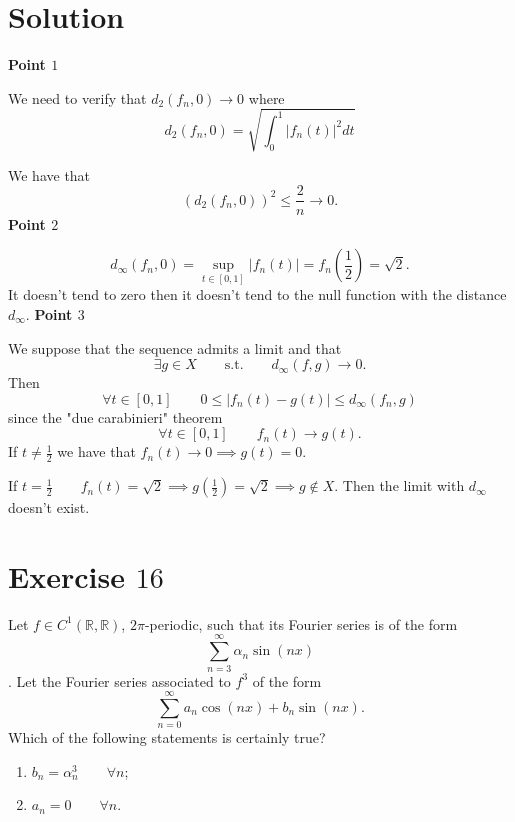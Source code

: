 \documentclass[a4paper, twoside, openany]{book}
\begin{document}
\section*{Solution}
\textbf{Point $1$} \par
We need to verify that $d_2(f_n, 0) \rightarrow 0$ where
$$d_2(f_n, 0) = \sqrt{\int_0^1 |f_n(t)|^2 dt}$$
\begin{figure}[!ht]
\begin{center}
\end{center}
\end{figure}
We have that
$$(d_2(f_n, 0))^2 \leq \frac{2}{n} \rightarrow 0.$$
\textbf{Point $2$} \par  
$$d_{\infty}(f_n, 0) = \sup_{t \in [0,1]} |f_n(t)| = f_n(\frac{1}{2}) = \sqrt{2}.$$
It doesn't tend to zero then it doesn't tend to the null function with the distance $d_{\infty}$.
\textbf{Point $3$} \par 
We suppose that the sequence admits a limit and that
$$\exists g \in X \qquad \textrm{s.t.} \qquad d_{\infty}(f, g) \rightarrow 0.$$
Then
$$\forall t \in [0, 1] \qquad 0 \leq |f_n(t) - g(t)| \leq d_{\infty}(f_n, g)$$
since the "due carabinieri" theorem 
$$\forall t \in [0, 1] \qquad f_n(t) \rightarrow g(t).$$
If $t \neq \frac{1}{2}$ we have that $f_n(t) \rightarrow 0 \implies g(t) = 0$. \par  
If $t = \frac{1}{2} \qquad f_n(t) = \sqrt{2} \implies g(\frac{1}{2}) = \sqrt{2} \implies g \notin X$. Then the limit with $d_{\infty}$ doesn't exist.
\clearpage
\section*{Exercise $16$}
Let $f \in C^1(\mathbb{R}, \mathbb{R})$, $2\pi$-periodic, such that its Fourier series is of the form
$$\sum_{n=3}^{\infty} \alpha_n \sin(n x)$$. Let the Fourier series associated to $f^3$ of the form 
$$\sum_{n=0}^{\infty} a_n \cos(n x) + b_n \sin(n x).$$
Which of the following statements is certainly true?
\begin{enumerate}
\item $b_n = \alpha_n^3 \qquad \forall n$;
\item $a_n = 0 \qquad \forall n$.
\end{enumerate}
\end{document}
